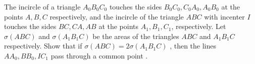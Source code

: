 The incircle of a triangle $A_0B_0C_0$ touches the sides $B_0C_0,C_0A_0,A_0B_0$ at the points $A,B,C$ respectively, and the incircle of the triangle $ABC$ with incenter $ I$ touches the sides $BC,CA, AB$ at the points $A_1, B_1,C_1$, respectively. Let $\sigma(ABC)$ and $\sigma(A_1B_1C)$ be the areas of the triangles $ABC$ and $A_1B_1C$ respectively. Show that if $\sigma(ABC) = 2 \sigma(A_1B_1C)$ , then the lines $AA_0, BB_0,IC_1$ pass through a common point .